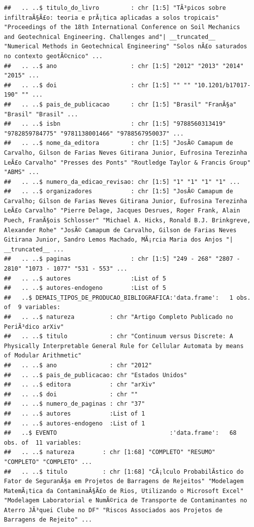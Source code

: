 \documentclass[]{article}
\begin{document}
\begin{verbatim}
##   .. ..$ titulo_do_livro         : chr [1:5] "TÃ³picos sobre infiltraÃ§Ã£o: teoria e prÃ¡tica aplicadas a solos tropicais" "Proceedings of the 18th International Conference on Soil Mechanics and Geotechnical Engineering. Challenges and"| __truncated__ "Numerical Methods in Geotechnical Engineering" "Solos nÃ£o saturados no contexto geotÃ©cnico" ...
##   .. ..$ ano                     : chr [1:5] "2012" "2013" "2014" "2015" ...
##   .. ..$ doi                     : chr [1:5] "" "" "10.1201/b17017-190" "" ...
##   .. ..$ pais_de_publicacao      : chr [1:5] "Brasil" "FranÃ§a" "Brasil" "Brasil" ...
##   .. ..$ isbn                    : chr [1:5] "9788560313419" "9782859784775" "9781138001466" "9788567950037" ...
##   .. ..$ nome_da_editora         : chr [1:5] "JosÃ© Camapum de Carvalho, Gilson de Farias Neves Gitirana Junior, Eufrosina Terezinha LeÃ£o Carvalho" "Presses des Ponts" "Routledge Taylor & Francis Group" "ABMS" ...
##   .. ..$ numero_da_edicao_revisao: chr [1:5] "1" "1" "1" "1" ...
##   .. ..$ organizadores           : chr [1:5] "JosÃ© Camapum de Carvalho; Gilson de Farias Neves Gitirana Junior, Eufrosina Terezinha LeÃ£o Carvalho" "Pierre Delage, Jacques Desrues, Roger Frank, Alain Puech, FranÃ§ois Schlosser" "Michael A. Hicks, Ronald B.J. Brinkgreve, Alexander Rohe" "JosÃ© Camapum de Carvalho, Gilson de Farias Neves Gitirana Junior, Sandro Lemos Machado, MÃ¡rcia Maria dos Anjos "| __truncated__ ...
##   .. ..$ paginas                 : chr [1:5] "249 - 268" "2807 - 2810" "1073 - 1077" "531 - 553" ...
##   .. ..$ autores                 :List of 5
##   .. ..$ autores-endogeno        :List of 5
##   ..$ DEMAIS_TIPOS_DE_PRODUCAO_BIBLIOGRAFICA:'data.frame':   1 obs. of  9 variables:
##   .. ..$ natureza          : chr "Artigo Completo Publicado no PeriÃ³dico arXiv"
##   .. ..$ titulo            : chr "Continuum versus Discrete: A Physically Interpretable General Rule for Cellular Automata by means of Modular Arithmetic"
##   .. ..$ ano               : chr "2012"
##   .. ..$ pais_de_publicacao: chr "Estados Unidos"
##   .. ..$ editora           : chr "arXiv"
##   .. ..$ doi               : chr ""
##   .. ..$ numero_de_paginas : chr "37"
##   .. ..$ autores           :List of 1
##   .. ..$ autores-endogeno  :List of 1
##   ..$ EVENTO                                :'data.frame':   68 obs. of  11 variables:
##   .. ..$ natureza        : chr [1:68] "COMPLETO" "RESUMO" "COMPLETO" "COMPLETO" ...
##   .. ..$ titulo          : chr [1:68] "CÃ¡lculo ProbabilÃ­stico do Fator de SeguranÃ§a em Projetos de Barragens de Rejeitos" "Modelagem MatemÃ¡tica da ContaminaÃ§Ã£o de Rios, Utilizando o Microsoft Excel" "Modelagem Laboratorial e NumÃ©rica de Transporte de Contaminantes no Aterro JÃ³quei Clube no DF" "Riscos Associados aos Projetos de Barragens de Rejeito" ...

\end{verbatim}
\end{document}
